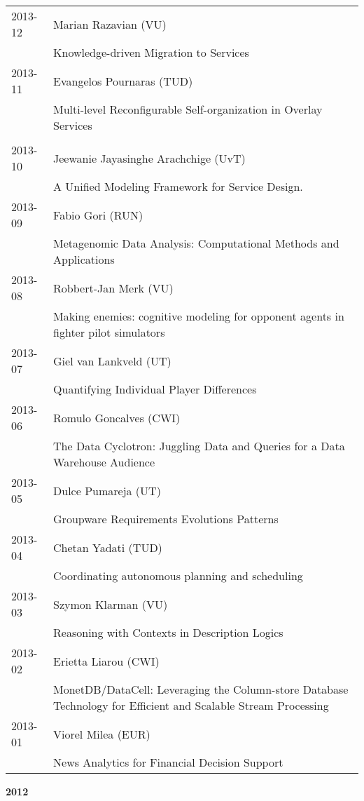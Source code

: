 \begin{longtable}{p{1.25cm}p{10.75cm}}
2013-12 & Marian Razavian (VU) \\& Knowledge-driven Migration to Services \\
2013-11 & Evangelos Pournaras (TUD) \\& Multi-level Reconfigurable Self-organization in Overlay Services \\
\\
2013-10 & Jeewanie Jayasinghe Arachchige (UvT) \\& A Unified Modeling Framework for Service Design. \\
2013-09 & Fabio Gori (RUN) \\& Metagenomic Data Analysis: Computational Methods and Applications \\
2013-08 & Robbert-Jan Merk (VU) \\& Making enemies: cognitive modeling for opponent agents in fighter pilot simulators \\
2013-07 & Giel van Lankveld (UT) \\& Quantifying Individual Player Differences \\
2013-06 & Romulo Goncalves (CWI) \\& The Data Cyclotron: Juggling Data and Queries for a Data Warehouse \newline Audience \\
2013-05 & Dulce Pumareja (UT) \\& Groupware Requirements Evolutions Patterns \\
2013-04 & Chetan Yadati (TUD) \\& Coordinating autonomous planning and scheduling \\
2013-03 & Szymon Klarman (VU) \\& Reasoning with Contexts in Description Logics \\
2013-02 & Erietta Liarou (CWI) \\& MonetDB/DataCell: Leveraging the Column-store Database Technology for Efficient and Scalable Stream Processing \\
2013-01 & Viorel Milea (EUR) \\& News Analytics for Financial Decision Support \\
\end{longtable}

\begin{center}
	\large{\textbf{2012}}
\end{center}

